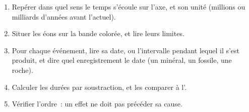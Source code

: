 \begin{method}\label{met:g12:early-earth:timeline}
\begin{enumerate}
  \item Repérer dans quel sens le temps s'écoule sur l'axe, et son unité
        (millions ou milliards d'années avant l'actuel).
  \item Situer les éons sur la bande colorée, et lire leurs limites.
  \item Pour chaque événement, lire sa date, ou l'intervalle pendant lequel
        il s'est produit, et dire quel enregistrement le date (un minéral,
        un fossile, une roche).
  \item Calculer les durées par soustraction, et les comparer à l'.
  \item Vérifier l'ordre~: un effet ne doit pas précéder sa cause.
\end{enumerate}
\end{method}

